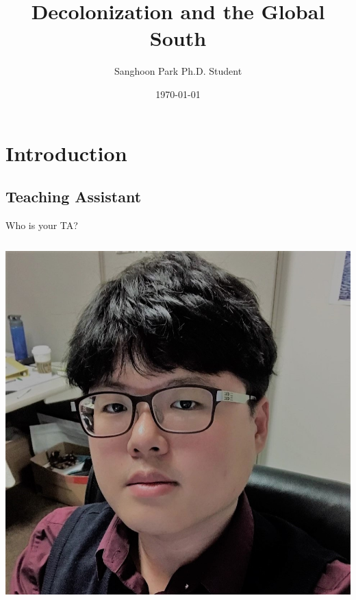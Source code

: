 \documentclass[xcolor=dvipsnames]{beamer}
\title[Decolonization and the Global South]{Decolonization and the Global South}
\date{\today}
\author[Sanghoon Park]{Sanghoon Park \newline \newline  \footnotesize{Ph.D. Student}}
\institute[UofSC]{Department of Political Science}
\begin{document}
	
	\begin{frame}
		\titlepage
	\end{frame}
	\begin{frame}
		\tableofcontents
	\end{frame}
	
	\section{Introduction}
	\subsection{Teaching Assistant}
	\begin{frame}[fragile]{Who is your TA?}
		\begin{columns}[T]
			\begin{column}{0.36\textwidth}
				\includegraphics[width=1\linewidth]{avatar.jpg}
			\end{column}
			

\end{columns}
\end{frame}
\end{document}
